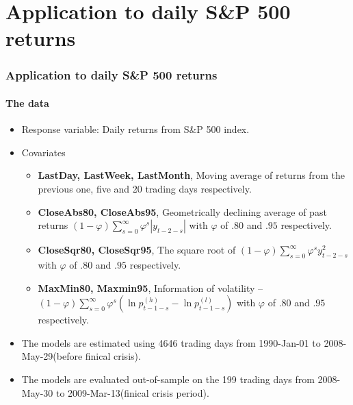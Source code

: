 \documentclass[10pt]{beamer}
\begin{document}
\section{Application to daily S\&P 500 returns}
\begin{frame}
\frametitle{Application to daily S\&P 500 returns}
\framesubtitle{The data}
\begin{itemize}
\item Response variable: Daily returns from S\&P 500 index.
\item Covariates
  \begin{itemize}
      \item \textbf{LastDay, LastWeek, LastMonth}, Moving average of returns from the
        previous one, five and 20 trading days respectively.
      \item \textbf{CloseAbs80, CloseAbs95}, Geometrically declining average of past
        returns $\left( {1 - \varphi } \right)\sum\nolimits_{s = 0}^\infty  {\varphi ^s
          |y_{t - 2 - s} |} $  with $\varphi$ of $.80$ and $.95$ respectively. 
      \item \textbf{CloseSqr80, CloseSqr95}, The square root of $\left( {1 - \varphi } \right)\sum\nolimits_{s = 0}^\infty  {\varphi ^s
          y_{t - 2 - s}^2} $  with $\varphi$ of $.80$ and $.95$ respectively.
      \item \textbf{MaxMin80, Maxmin95}, Information of volatility -- $\left( {1 - \varphi } \right)\sum\nolimits_{s =
          0}^\infty  {\varphi ^s \left( {\ln p_{t - 1 - s}^{(h)}  - \ln p_{t - 1 -
                s}^{(l)} } \right)} $ with $\varphi$ of $.80$ and $.95$ respectively.
  \end{itemize}

\item The models are estimated using 4646 trading days from 1990-Jan-01 to
  2008-May-29(before finical crisis). 
\item The models are evaluated out-of-sample on the 199 trading days from 2008-May-30 to
  2009-Mar-13(finical crisis period). 

\end{itemize}
\end{frame}    
\end{document}
